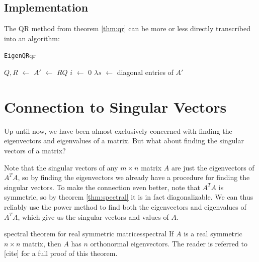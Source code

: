 \documentclass{article}
\def\store{$\leftarrow$ }
\begin{document}
\subsection{Implementation}
The QR method from theorem \ref{thm:qr} can be more or less directly transcribed into an algorithm:

\begin{algo}{\texttt{EigenQR}}{qr}
  \begin{algorithm}[H]

    \BlankLine
    $Q,R$ \store {}\;
    $A'$ \store $RQ$\;
    $i$ \store $0$
    \While{$\lVert A' - A\rVert > \varepsilon$ {\normalfont and } $i < N$}{
      $Q,R$ \store \QRDecomposition{$A'$}\;
      $A$ \store $A'$\;
      $A'$ \store $RQ$\;
      $i$ \store $i + 1$\;
    }
    $\lambda s$ \store diagonal entries of $A'$\;
  \end{algorithm}
\end{algo}

\section{Connection to Singular Vectors}
Up until now, we have been almost exclusively concerned with finding the eigenvectors and eigenvalues of a matrix. But what about finding the singular vectors of a matrix?

Note that the singular vectors of any $m \times n$ matrix $A$ are just the eigenvectors of $A^TA$, so by finding the eigenvectors we already have a procedure for finding the singular vectors. To make the connection even better, note that $A^TA$ is symmetric, so by theorem \ref{thm:spectral} it is in fact diagonalizable. We can thus reliably use the power method to find both the eigenvectors and eigenvalues of $A^TA$, which give us the singular vectors and values of $A$.

\begin{theorem}{spectral theorem for real symmetric matrices}{spectral}
  If $A$ is a real symmetric $n \times n$ matrix, then $A$ has $n$ orthonormal eigenvectors. The reader is referred to [cite] for a full proof of this theorem.
\end{theorem}
\end{document}
